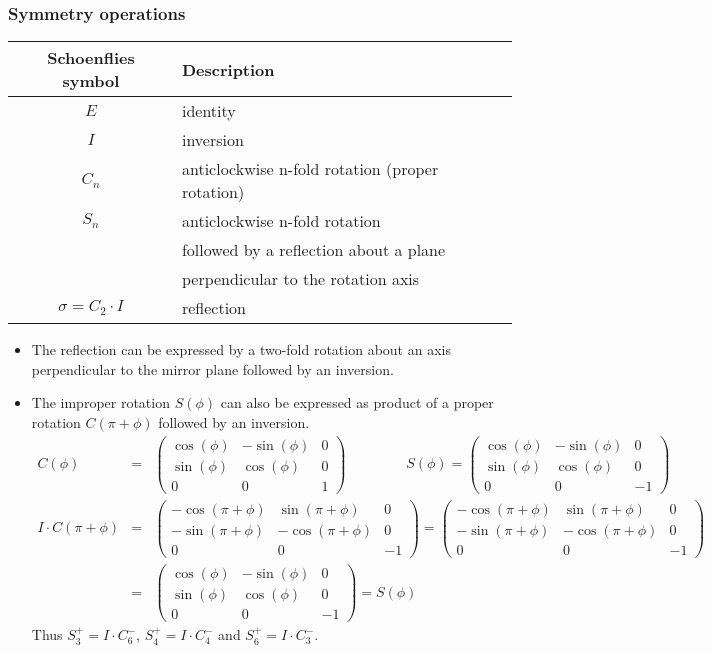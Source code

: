 \documentclass[11pt,a4paper]{report}
\begin{document}
\subsubsection{Symmetry operations}
\begin{center}
\begin{tabular}{|c|l|}
\hline
Schoenflies symbol &  Description\\
\hline
$E$ & identity \\
$I$ & inversion \\
$C_n$ & anticlockwise n-fold rotation (proper rotation)\\
$S_n$ & anticlockwise n-fold rotation\\
    & followed by a reflection about a plane \\
    & perpendicular to the rotation axis\\
$\sigma=C_2\cdot I$ & reflection\\
\hline
\end{tabular}
\end{center}
\begin{itemize}
\item The reflection can be expressed by a two-fold rotation about an axis
perpendicular to the mirror plane followed by an inversion.
%
\item The improper rotation $S(\phi)$ can also be expressed as product of a
proper rotation $C(\pi+\phi)$ followed by an inversion.
\begin{eqnarray}
C(\phi)&=&\left(\begin{array}{ccc}
\cos(\phi)& -\sin(\phi) & 0\\
\sin(\phi)& \cos(\phi) & 0\\
0& 0& 1\end{array}\right)
\qquad\;\qquad
S(\phi)=\left(\begin{array}{ccc}
\cos(\phi)& -\sin(\phi) & 0\\
\sin(\phi)& \cos(\phi) & 0\\
0& 0& -1\end{array}\right)
\nonumber\\
I\cdot C(\pi+\phi)
&=&\left(\begin{array}{ccc}
-\cos(\pi+\phi)& \sin(\pi+\phi) & 0\\
-\sin(\pi+\phi)& -\cos(\pi+\phi) & 0\\
0& 0& -1\end{array}\right)
=\left(\begin{array}{ccc}
-\cos(\pi+\phi)& \sin(\pi+\phi) & 0\\
-\sin(\pi+\phi)& -\cos(\pi+\phi) & 0\\
0& 0& -1\end{array}\right)
\nonumber\\
&=&\left(\begin{array}{ccc}
\cos(\phi)& -\sin(\phi) & 0\\
\sin(\phi)& \cos(\phi) & 0\\
0& 0& -1\end{array}\right)
=S(\phi)
\end{eqnarray}
Thus $S_3^+=I\cdot C_6^-$, $S_4^+=I\cdot C_4^-$ and $S_6^+=I\cdot C_3^-$. 
\end{itemize}
\end{document}
